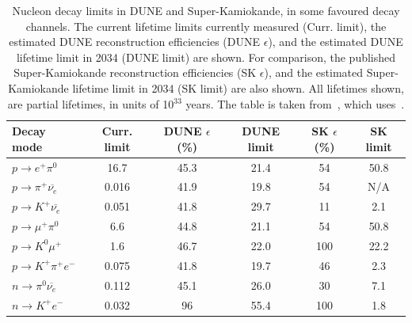 \begin{table}
  \caption[Nucleon decay limits in DUNE and Super-Kamiokande, in some favoured decay channels]
          {Nucleon decay limits in DUNE and Super-Kamiokande, in some favoured decay channels. The current lifetime limits currently measured (Curr. limit), the estimated DUNE reconstruction efficiencies (DUNE $\epsilon$), and the estimated DUNE lifetime limit in 2034 (DUNE limit) are shown. For comparison, the published Super-Kamiokande reconstruction efficiencies (SK $\epsilon$), and the estimated Super-Kamiokande lifetime limit in 2034 (SK limit) are also shown. All lifetimes shown, are partial lifetimes, in units of 10$^{33}$ years. The table is taken from~\citep{MauryLifetime}, which uses~\citep{PDGReview}.}
  \centering
  \label{tab:NDKLim}
  \begin{tabular}{l c c c c c}
    \toprule
    {Decay mode}                               & {Curr. limit} & {DUNE $\epsilon$ (\%)} & {DUNE limit} & {SK $\epsilon$ (\%)} & {SK limit} \\ 
    \midrule
    $p \rightarrow e^{+} \pi^{0}$              & 16.7          & 45.3              & 21.4         & 54              & 50.8       \\
    
    $p \rightarrow \pi^{+} \overline{\nu_{e}}$ & 0.016         & 41.9              & 19.8         & 54              & N/A        \\
    
    $p \rightarrow K^{+} \overline{\nu_{e}}$   & 0.051         & 41.8              & 29.7         & 11              & 2.1        \\
    
    $p \rightarrow \mu^{+} \pi^{0}$            & 6.6           & 44.8              & 21.1         & 54              & 50.8       \\
    
    $p \rightarrow K^{0} \mu^{+}$              & 1.6           & 46.7              & 22.0         & 100             & 22.2       \\

    $p \rightarrow K^{+} \pi^{+} e^{-}$        & 0.075         & 41.8              & 19.7         & 46              & 2.3        \\
    
    $n \rightarrow \pi^{0} \overline{\nu_{e}}$ & 0.112         & 45.1              & 26.0         & 30              & 7.1        \\
    
    $n \rightarrow K^{+} e^{-}$                & 0.032         & 96                & 55.4         & 100             & 1.8        \\
    \bottomrule
  \end{tabular}
\end{table}

